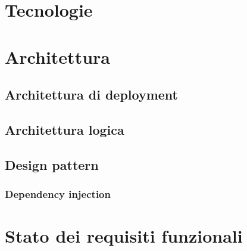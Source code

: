 \documentclass[a4paper,12pt]{article}
\begin{document}
    \section{Tecnologie} {

    }

    \section{Architettura} {
        \subsection{Architettura di deployment} {

        }

        \subsection{Architettura logica} {
            
        }

        \subsection{Design pattern} {
            \subsubsection{Dependency injection} {
                
            }
        }
    }

    \section{Stato dei requisiti funzionali} {
        
    }
\end{document}
